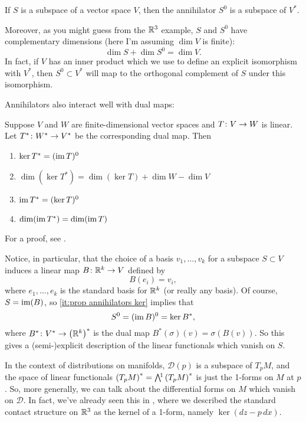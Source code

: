 \begin{proposition}\label{prop:annihilator is subspace}
	If $S$ is a subspace of a vector space $V$, then the annihilator $S^0$ is a subspace of $V^\ast$.
\end{proposition}

Moreover, as you might guess from the $\mathbb{R}^3$ example, $S$ and $S^0$ have complementary dimensions (here I'm assuming $\dim V$ is finite):
\[
	\dim S + \dim S^0 = \dim V.
\]
In fact, if $V$ has an inner product which we use to define an explicit isomorphism with $V^\ast$, then $S^0 \subset V^\ast$ will map to the orthogonal complement of $S$ under this isomorphism.

Annihilators also interact well with dual maps:

\begin{proposition}\label{prop:annihilators and duals}
	Suppose $V$ and $W$ are finite-dimensional vector spaces and $T \colon\thinspace\! V \to W$ is linear. Let $T^\ast \colon\thinspace\! W^\ast \to V^\ast$ be the corresponding dual map. Then
	\begin{enumerate}
		\item \label{it:prop annihilators ker} $\ker T^\ast = (\operatorname{im} T)^0$
		\item $\dim (\ker T^\ast) = \dim (\ker T) + \dim W - \dim V$
		\item $\operatorname{im} T^\ast = (\ker T)^0$
		\item $\dim(\operatorname{im} T^\ast) = \dim (\operatorname{im} T)$
	\end{enumerate}
\end{proposition}

For a proof, see \cite[\S 3.F]{axlerLinearAlgebraDone2015}.

Notice, in particular, that the choice of a basis $v_1, \dots , v_k$ for a subspace $S \subset V$ induces a linear map $B \colon\thinspace\! \mathbb{R}^k \to V$ defined by
\[
	B(e_i) = v_i,
\]
where $e_1, \dots , e_k$ is the standard basis for $\mathbb{R}^k$ (or really any basis). Of course, $S = \operatorname{im}(B)$, so \ref{it:prop annihilators ker} implies that
\[
	S^0 = (\operatorname{im} B)^0 = \ker B^\ast,
\]
where $B^\ast \colon\thinspace\! V^\ast \to \left(\mathbb{R}^k\right)^\ast$ is the dual map $B^\ast(\sigma)(v) = \sigma(B(v))$. So this gives a (semi-)explicit description of the linear functionals which vanish on $S$.

In the context of distributions on manifolds, $\mathcal{D}(p)$ is a subspace of $T_pM$, and the space of linear functionals $\left(T_pM\right)^\ast = \ext{1}\left(T_pM\right)^\ast$ is just the 1-forms on $M$ at $p$. So, more generally, we can talk about the differential forms on $M$ which vanish on $\mathcal{D}$. In fact, we've already seen this in , where we described the standard contact structure on $\mathbb{R}^3$ as the kernel of a 1-form, namely $\ker(dz - p\, dx)$.

